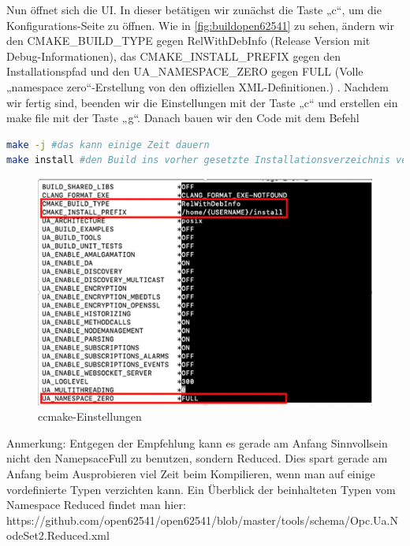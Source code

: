 Nun öffnet sich die UI. In dieser betätigen wir zunächst die Taste „c“, um die Konfigurations-Seite zu öffnen. Wie in \autoref{fig:buildopen62541} zu sehen, ändern wir den CMAKE\_BUILD\_TYPE gegen RelWithDebInfo (Release Version mit Debug-Informationen), das 
CMAKE\_INSTALL\_PREFIX gegen den Installationspfad und den UA\_NAMESPACE\_ZERO gegen FULL (Volle „namespace zero“-Erstellung von den offiziellen XML-Definitionen.) . Nachdem wir fertig sind, beenden wir die Einstellungen mit der Taste „c“ und erstellen ein make file mit der Taste „g“.
Danach bauen wir den Code mit dem Befehl
\begin{lstlisting}[language=Bash]
make -j #das kann einige Zeit dauern
make install #den Build ins vorher gesetzte Installationsverzeichnis verschieben
\end{lstlisting}
  
\begin{figure}[H]
	\centering
	\includegraphics[width=0.6\linewidth]{abb/Build_Open62541}
	\caption{ccmake-Einstellungen}
	\label{fig:buildopen62541}
\end{figure}

Anmerkung:
Entgegen der Empfehlung kann es gerade am Anfang Sinnvollsein nicht den NamepsaceFull zu benutzen, sondern Reduced. Dies spart gerade am Anfang beim Ausprobieren viel Zeit beim Kompilieren, wenn man auf einige vordefinierte Typen verzichten kann.
Ein Überblick der beinhalteten Typen vom Namespace Reduced findet man hier:
https://github.com/open62541/open62541/blob/master/tools/schema/Opc.Ua.NodeSet2.Reduced.xml

